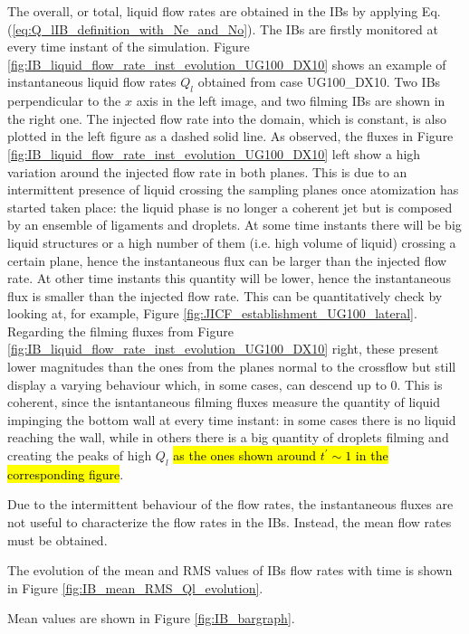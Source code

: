 The overall, or total, liquid flow rates are obtained in the IBs by applying Eq. (\ref{eq:Q_lIB_definition_with_Ne_and_No}). The IBs are firstly monitored at every time instant of the simulation. Figure \ref{fig:IB_liquid_flow_rate_inst_evolution_UG100_DX10} shows an example of instantaneous liquid flow rates $Q_l$ obtained from case UG100\_DX10. Two IBs perpendicular to the $x$ axis in the left image, and two filming IBs are shown in the right one. The injected flow rate into the domain, which is constant, is also plotted in the left figure as a dashed solid line. As observed, the fluxes in Figure \ref{fig:IB_liquid_flow_rate_inst_evolution_UG100_DX10} left show a high variation around the injected flow rate in both planes. This is due to an intermittent presence of liquid crossing the sampling planes once atomization has started taken place: the liquid phase is no longer a coherent jet but is composed by an ensemble of ligaments and droplets. At some time instants there will be big liquid structures or a high number of them (i.e. high volume of liquid) crossing a certain plane, hence the instantaneous flux can be larger than the injected flow rate. At other time instants this quantity will be lower, hence the instantaneous flux is smaller than the injected flow rate. This can be quantitatively check by looking at, for example, Figure \ref{fig:JICF_establishment_UG100_lateral}. Regarding the filming fluxes from Figure \ref{fig:IB_liquid_flow_rate_inst_evolution_UG100_DX10} right, these present lower magnitudes than the ones from the planes normal to the crossflow but still display a varying behaviour which, in some cases, can descend up to $0$. This is coherent, since the isntantaneous filming fluxes measure the quantity of liquid impinging the bottom wall at every time instant: in some cases there is no liquid reaching the wall, while in others there is a big quantity of droplets filming and creating the peaks of high $Q_l$ \hl{as the ones shown around $t^{\prime} \sim 1$ in the corresponding figure}.

Due to the intermittent behaviour of the flow rates, the instantaneous fluxes are not useful to characterize the flow rates in the IBs. Instead, the mean flow rates must be obtained. 

The evolution of the mean and RMS values of IBs flow rates with time is shown in Figure \ref{fig:IB_mean_RMS_Ql_evolution}.

Mean values are shown in Figure \ref{fig:IB_bargraph}.

\clearpage


